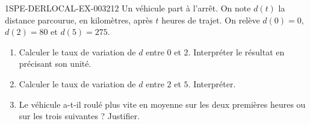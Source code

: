 \begin{exercice}{1SPE-DERLOCAL-EX-003}{2}{12}
Un véhicule part à l'arrêt. On note $d(t)$ la distance parcourue, en kilomètres, après $t$ heures de trajet. On relève $d(0)=0$, $d(2)=80$ et $d(5)=275$.

\begin{enumerate}
  \item Calculer le taux de variation de $d$ entre $0$ et $2$. Interpréter le résultat en précisant son unité.
  \item Calculer le taux de variation de $d$ entre $2$ et $5$. Interpréter.
  \item Le véhicule a-t-il roulé plus vite en moyenne sur les deux premières heures ou sur les trois suivantes ? Justifier.
\end{enumerate}
\end{exercice}
